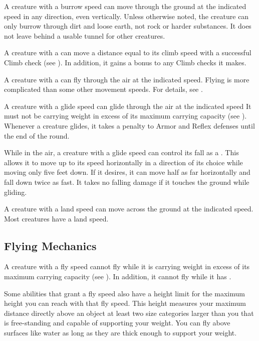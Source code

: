         A creature with a burrow speed can move through the ground at the indicated speed in any direction, even vertically. Unless otherwise noted, the creature can only burrow through dirt and loose earth, not rock or harder substances. It does not leave behind a usable tunnel for other creatures.

        A creature with a  can move a distance equal to its climb speed with a successful Climb check (see ).
        In addition, it gains a  bonus to any Climb checks it makes.

        \label{Flying}
        A creature with a  can fly through the air at the indicated speed.
        Flying is more complicated than some other movement speeds.
        For details, see .

        \label{Gliding}
        A creature with a glide speed can glide through the air at the indicated speed
        It must not be carrying weight in excess of its maximum carrying capacity (see ).
        Whenever a creature glides, it takes a  penalty to Armor and Reflex defenses until the end of the round.

        While in the air, a creature with a glide speed can control its fall as a . This allows it to move up to its speed horizontally in a direction of its choice while moving only five feet down. If it desires, it can move half as far horizontally and fall down twice as fast. It takes no falling damage if it touches the ground while gliding.

        A creature with a land speed can move across the ground at the indicated speed.
        Most creatures have a land speed.

    \subsection{Flying Mechanics}\label{Flying Mechanics}
        A creature with a fly speed cannot fly while it is carrying weight in excess of its maximum carrying capacity (see ).
        In addition, it cannot fly while it has .

         Some abilities that grant a fly speed also have a height limit for the maximum height you can reach with that fly speed.
        This height measures your maximum distance directly above an object at least two size categories larger than you that is free-standing and capable of supporting your weight.
        You can fly above surfaces like water as long as they are thick enough to support your weight.

